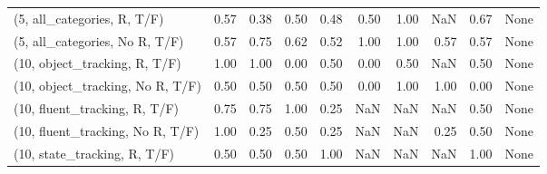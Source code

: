 \begin{table*}[h!]
\begin{adjustbox}{width=2\columnwidth,center}
\begin{tabular}{lrrr|rrr|rrr}
(5, all\_categories, R, T/F)          &                      0.57 &                  0.38 &                      0.50 &                          0.48 &                      0.50 &                          1.00 &                                    NaN &                               0.67 &                                  None \\
(5, all\_categories, No R, T/F)       &                      0.57 &                  0.75 &                      0.62 &                          0.52 &                      1.00 &                          1.00 &                                   0.57 &                               0.57 &                                  None \\



\midrule
(10, object\_tracking, R, T/F)         &                      1.00 &                  1.00 &                      0.00 &                          0.50 &                      0.00 &                          0.50 &                                    NaN &                               0.50 &                                  None \\
(10, object\_tracking, No R, T/F)      &                      0.50 &                  0.50 &                      0.50 &                          0.50 &                      0.00 &                          1.00 &                                   1.00 &                               0.00 &                                  None \\
(10, fluent\_tracking, R, T/F)         &                      0.75 &                  0.75 &                      1.00 &                          0.25 &                       NaN &                           NaN &                                    NaN &                               0.50 &                                  None \\
(10, fluent\_tracking, No R, T/F)      &                      1.00 &                  0.25 &                      0.50 &                          0.25 &                       NaN &                           NaN &                                   0.25 &                               0.50 &                                  None \\
(10, state\_tracking, R, T/F)          &                      0.50 &                  0.50 &                      0.50 &                          1.00 &                       NaN &                           NaN &                                    NaN &                               1.00 &                                  None \\

\end{tabular}
\end{adjustbox}
\end{table*}
